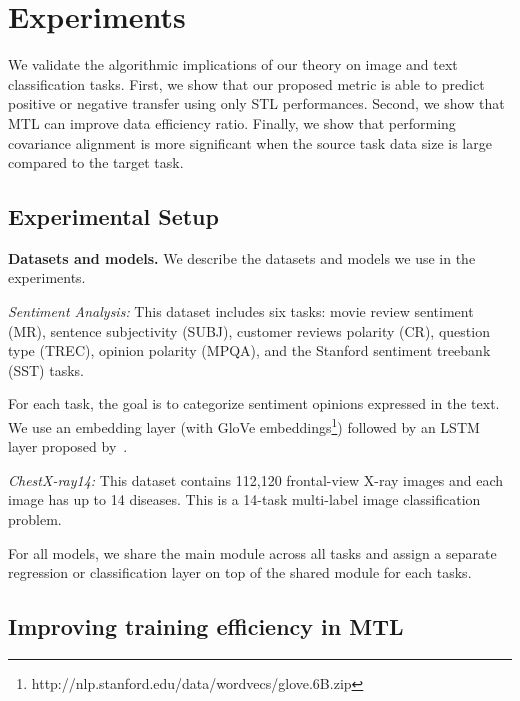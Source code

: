 \section{Experiments}

We validate the algorithmic implications of our theory on image and text classification tasks.
First, we show that our proposed metric is able to predict positive or negative transfer using only STL performances.
Second, we show that MTL can improve data efficiency ratio.
Finally, we show that performing covariance alignment is more significant when the source task data size is large compared to the target task.

\subsection{Experimental Setup}

{\bf Datasets and models.} We describe the datasets and models we use in the experiments.

{\it Sentiment Analysis:} This dataset includes six tasks: movie review sentiment (MR), sentence subjectivity (SUBJ), customer reviews polarity (CR), question type (TREC), opinion polarity (MPQA), and the Stanford sentiment treebank (SST) tasks.

{For each task, the goal is to categorize sentiment opinions expressed in the text.
We use an embedding layer (with GloVe embeddings\footnote{http://nlp.stanford.edu/data/wordvecs/glove.6B.zip}) followed by an LSTM layer proposed by~\cite{lei2018simple}.
}

{\it ChestX-ray14:} This dataset contains 112,120 frontal-view X-ray images and each image has up to 14 diseases.
This is a 14-task multi-label image classification problem.

For all models, we share the main module across all tasks and assign a separate regression or classification layer on top of the shared module for each tasks.

\subsection{Improving training efficiency in MTL}

